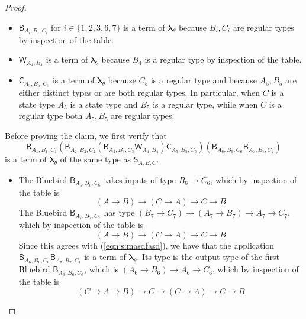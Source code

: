 \documentclass{lmcs} %
\newcommand{\param}{\theta}
\newcommand{\mltup}{\boldsymbol\lambda_{\param}}
\newcommand{\ctS}[6]{{\mathsf S}_{#1, #2, #3}#4#5#6}
\newcommand{\ctC}[6]{{\mathsf C}_{#1, #2, #3}#4#5#6}
\newcommand{\ctW}[4]{{\mathsf W}_{#1, #2}#3#4}
\newcommand{\ctB}[6]{{\mathsf B}_{#1, #2, #3}#4#5#6}
\begin{document}
\begin{proof}
\begin{proofdetail}
\begin{itemize}[leftmargin=*]
    \item $\ctB{A_i}{B_i}{C_i}{}{}{}$ for $i\in \{1,2,3,6,7\}$ is a term of $\mltup$ because $B_i,C_i$ are regular types by inspection of the table.
    \item $\ctW{A_4}{B_4}{}{}$ is a term of $\mltup$ because $B_4$ is a regular type by inspection of the table.
    \item $\ctC{A_5}{B_5}{C_5}{}{}{}$ is a term of $\mltup$ because $C_5$ is a regular type and because $A_5, B_5$ are either distinct types or are both regular types. In particular, when $C$ is a state type $A_5$ is a state type and $B_5$ is a regular type, while when $C$ is a regular type both $A_5, B_5$ are regular types.
\end{itemize}


Before proving the claim, we first verify that 
\begin{equation}\label{eqn:s:calc:whatis}
\ctB{A_1}{B_1}{C_1}{}{}{} (\ctB{A_2}{B_2}{C_2}{}{}{} (\ctB{A_3}{B_3}{C_3}{}{}{} \ctW{A_4}{B_4}{}{}) \ctC{A_5}{B_5}{C_5}{}{}{}) (\ctB{A_6}{B_6}{C_6}{}{}{} \ctB{A_7}{B_7}{C_7}{}{}{})
\end{equation}
is a term of $\mltup$ of the same type as $\ctS{A}{B}{C}{}{}{}$.
\begin{itemize}[leftmargin=*]
\item The Bluebird $\ctB{A_6}{B_6}{C_6}{}{}{}$ takes inputs of type $B_6\rightarrow C_6$, which by inspection of the table is
\begin{equation}\label{eqn:s:masdfasd}
(A\rightarrow B)\rightarrow (C\rightarrow A)\rightarrow C\rightarrow B 
\end{equation}
The Bluebird $\ctB{A_7}{B_7}{C_7}{}{}{}$ has type $(B_7\rightarrow C_7)\rightarrow (A_7\rightarrow B_7)\rightarrow A_7\rightarrow C_7$, which by inspection of the table is 
\begin{equation*}
(A\rightarrow B)\rightarrow (C\rightarrow A)\rightarrow C\rightarrow B
\end{equation*}
Since this agrees with (\ref{eqn:s:masdfasd}), we have that the application $\ctB{A_6}{B_6}{C_6}{}{}{} \ctB{A_7}{B_7}{C_7}{}{}{}$ is a term of $\mltup$. Its type is the output type of the first Bluebird  $\ctB{A_6}{B_6}{C_6}{}{}{}$, which is $(A_6\rightarrow B_6)\rightarrow A_6\rightarrow C_6$, which by inspection of the table is
\begin{equation}\label{eqn:s:calc:calc:calc}
(C\rightarrow A\rightarrow B)\rightarrow C\rightarrow (C\rightarrow A)\rightarrow C\rightarrow B
\end{equation}

\end{itemize}
\end{proofdetail}
\end{proof}
\end{document}
